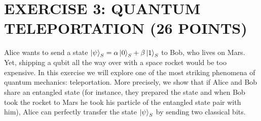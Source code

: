 \documentclass[12pt]{article}
\begin{document}
\section{EXERCISE 3: QUANTUM TELEPORTATION (26 POINTS)}

Alice wants to send a state $\ket{\psi}_S = \alpha\ket{0}_S + \beta\ket{1}_S$ to Bob, who lives on Mars. Yet, shipping a qubit all the way over with a space rocket would be too expensive. In this exercise we will explore one of the most striking phenomena of quantum mechanics: teleportation. More precisely, we show that if Alice and Bob share an entangled state (for instance, they prepared the state and when Bob took the rocket to Mars he took his particle of the entangled state pair with him), Alice can perfectly transfer the state $\ket{\psi}_S$ by sending two classical bits.
\end{document}
